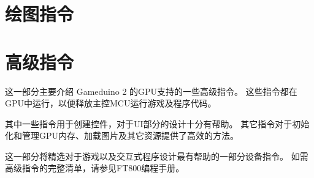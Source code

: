 \documentclass[10pt]{book}
\makeatletter
\newcommand{\gdtwo}{Gameduino 2 }
\newcommand{\mach}[1]{\texttt{\textbf{#1}}}
\newcommand{\cmdidx}[1]{
\index{#1@\mach{#1()}}
}
\newcommand{\cmd}[1]{\cmdidx{cmd\_#1}\nameref{cmd:#1}}
\makeatother
\begin{document}
\begin{CJK}{UTF8}{gkai}
\chapter{绘图指令}

\newcommand{\drawcmd}[2]{
\newpage
\section{\texttt{#1}}
\label{#1}
\index{#1@\mach{#1()}|boldindex}

#2

}

\newcommand{\lightcmd}[3]{
\section{\texttt{#1}}
\label{#2}
\index{#1@\mach{#1()}|boldindex}


}



\chapter{高级指令}

这一部分主要介绍 \gdtwo 的GPU支持的一些高级指令。
这些指令都在GPU中运行，以便释放主控MCU运行游戏及程序代码。

其中一些指令用于创建控件，对于UI部分的设计十分有帮助。
其它指令对于初始化和管理GPU内存、加载图片及其它资源提供了高效的方法。

这一部分将精选对于游戏以及交互式程序设计最有帮助的一部分设备指令。
如需高级指令的完整清单，请参见FT800编程手册。

\newcommand{\highcmd}[2]{
\section{\texttt{cmd\_#1}}
\label{cmd:#1}
\index{cmd\_#1@\mach{cmd\_#1()}|boldindex}
}


\end{CJK}
\end{document}
